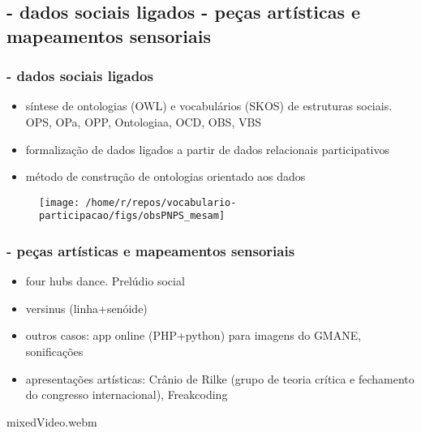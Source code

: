 \documentclass[10pt]{beamer}
\begin{document}
\begin{frame}
\subsection{- dados sociais ligados \;\; - peças artísticas e mapeamentos sensoriais}
\frametitle{- dados sociais ligados}
\begin{itemize}
	\item síntese de ontologias (OWL) e vocabulários (SKOS) de estruturas sociais. OPS, OPa, OPP, Ontologiaa, OCD, OBS, VBS
	\item formalização de dados ligados a partir de dados relacionais participativos
	\item método de construção de ontologias orientado aos dados
\end{itemize}

\begin{figure}[h!]
    \centering
    \texttt{[image: /home/r/repos/vocabulario-participacao/figs/obsPNPS\_mesam]}
\end{figure}


\end{frame}

\begin{frame}
\frametitle{- peças artísticas e mapeamentos sensoriais}
\begin{itemize}
	\item four hubs dance. Prelúdio social
	\item versinus (linha+senóide)
	\item outros casos: app online (PHP+python) para imagens do GMANE, sonificações
	\item apresentações artísticas: Crânio de Rilke (grupo de teoria crítica e fechamento do congresso internacional), Freakcoding
\end{itemize}

\begin{center}
%
{mixedVideo.webm} %
\end{center}

\end{frame}
\end{document}
